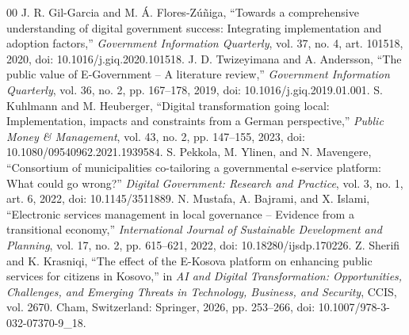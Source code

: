 \documentclass[conference]{IEEEtran}
\begin{document}
\begin{thebibliography}{00}
 J. R. Gil-Garcia and M. Á. Flores-Zúñiga, ``Towards a comprehensive understanding of digital government success: Integrating implementation and adoption factors,'' \emph{Government Information Quarterly}, vol. 37, no. 4, art. 101518, 2020, doi: 10.1016/j.giq.2020.101518.
 J. D. Twizeyimana and A. Andersson, ``The public value of E-Government -- A literature review,'' \emph{Government Information Quarterly}, vol. 36, no. 2, pp. 167--178, 2019, doi: 10.1016/j.giq.2019.01.001.
 S. Kuhlmann and M. Heuberger, ``Digital transformation going local: Implementation, impacts and constraints from a German perspective,'' \emph{Public Money \& Management}, vol. 43, no. 2, pp. 147--155, 2023, doi: 10.1080/09540962.2021.1939584.
 S. Pekkola, M. Ylinen, and N. Mavengere, ``Consortium of municipalities co-tailoring a governmental e-service platform: What could go wrong?'' \emph{Digital Government: Research and Practice}, vol. 3, no. 1, art. 6, 2022, doi: 10.1145/3511889.
 N. Mustafa, A. Bajrami, and X. Islami, ``Electronic services management in local governance -- Evidence from a transitional economy,'' \emph{International Journal of Sustainable Development and Planning}, vol. 17, no. 2, pp. 615--621, 2022, doi: 10.18280/ijsdp.170226.
 Z. Sherifi and K. Krasniqi, ``The effect of the E-Kosova platform on enhancing public services for citizens in Kosovo,'' in \emph{AI and Digital Transformation: Opportunities, Challenges, and Emerging Threats in Technology, Business, and Security}, CCIS, vol. 2670. Cham, Switzerland: Springer, 2026, pp. 253--266, doi: 10.1007/978-3-032-07370-9\_18.
\end{thebibliography}
\end{document}
